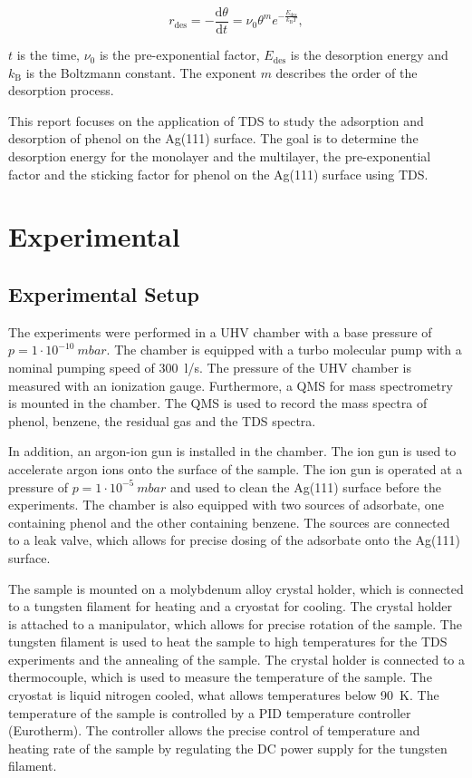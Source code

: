 \documentclass[fontsize=11pt,reqno,a4paper,oneside]{scrartcl}
\begin{document}
\begin{equation}
r_\mathrm{des} = - \frac{\mathrm{d}\theta}{\mathrm{d}t} = \nu_0 \theta^m e^{-\frac{E_\mathrm{des}}{k_\mathrm{B} T}},
\end{equation}

$t$ is the time, $\nu_0$ is the pre-exponential factor, $E_\mathrm{des}$ is the desorption energy and $k_\mathrm{B}$ is the Boltzmann constant. The exponent $m$ describes the order of the desorption process.

This report focuses on the application of \ac{TDS} to study the adsorption and desorption of phenol on the Ag(111) surface. The goal is to determine the desorption energy for the monolayer and the multilayer, the pre-exponential factor and the sticking factor for phenol on the Ag(111) surface using \ac{TDS}.

\clearpage
\section{Experimental}

\subsection{Experimental Setup}
The experiments were performed in a \ac{UHV} chamber with a base pressure of $p=1\cdot10^{-10}~\si{mbar}$. The chamber is equipped with a turbo molecular pump with a nominal pumping speed of 300~l/s. The pressure of the \ac{UHV} chamber is measured with an ionization gauge. Furthermore, a \ac{QMS} for mass spectrometry is mounted in the chamber. The \ac{QMS} is used to record the mass spectra of phenol, benzene, the residual gas and the \ac{TDS} spectra.

In addition, an argon-ion gun is installed in the chamber. The ion gun is used to accelerate argon ions onto the surface of the sample. The ion gun is operated at a pressure of $p=1\cdot10^{-5}~\si{mbar}$ and used to clean the Ag(111) surface before the experiments. The chamber is also equipped with two sources of adsorbate, one containing phenol and the other containing benzene. The sources are connected to a leak valve, which allows for precise dosing of the adsorbate onto the Ag(111) surface.

The sample is mounted on a molybdenum alloy crystal holder, which is connected to a tungsten filament for heating and a cryostat for cooling. The crystal holder is attached to a manipulator, which allows for precise rotation of the sample. The tungsten filament is used to heat the sample to high temperatures for the \ac{TDS} experiments and the annealing of the sample. The crystal holder is connected to a thermocouple, which is used to measure the temperature of the sample. The cryostat is liquid nitrogen cooled, what allows temperatures below 90~K. The temperature of the sample is controlled by a PID temperature controller (Eurotherm). The controller allows the precise control of temperature and heating rate of the sample by regulating the DC power supply for the tungsten filament.
\end{document}
